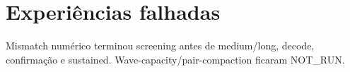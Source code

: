 \section{Experiências falhadas}
Mismatch numérico terminou screening antes de medium/long, decode, confirmação e sustained. Wave-capacity/pair-compaction ficaram NOT\_RUN.
